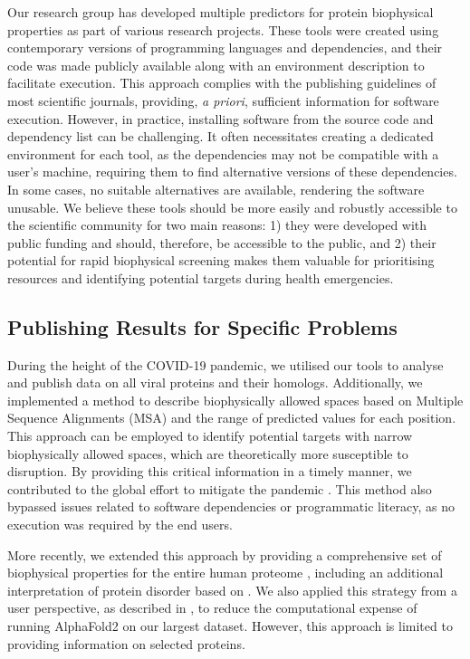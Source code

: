 Our research group has developed multiple predictors for protein biophysical properties as part of various research projects. These tools were created using contemporary versions of programming languages and dependencies, and their code was made publicly available along with an environment description to facilitate execution. This approach complies with the publishing guidelines of most scientific journals, providing, \textit{a priori}, sufficient information for software execution. However, in practice, installing software from the source code and dependency list can be challenging. It often necessitates creating a dedicated environment for each tool, as the dependencies may not be compatible with a user’s machine, requiring them to find alternative versions of these dependencies. In some cases, no suitable alternatives are available, rendering the software unusable. We believe these tools should be more easily and robustly accessible to the scientific community for two main reasons: 1) they were developed with public funding and should, therefore, be accessible to the public, and 2) their potential for rapid biophysical screening makes them valuable for prioritising resources and identifying potential targets during health emergencies.

\subsection{Publishing Results for Specific Problems}

During the height of the COVID-19 pandemic, we utilised our tools to analyse and publish data on all viral proteins and their homologs. Additionally, we implemented a method to describe biophysically allowed spaces based on Multiple Sequence Alignments (MSA) and the range of predicted values for each position. This approach can be employed to identify potential targets with narrow biophysically allowed spaces, which are theoretically more susceptible to disruption. By providing this critical information in a timely manner, we contributed to the global effort to mitigate the pandemic \cite{kagami_online_2021}. This method also bypassed issues related to software dependencies or programmatic literacy, as no execution was required by the end users.

More recently, we extended this approach by providing a comprehensive set of biophysical properties for the entire human proteome \cite{bio2byte_bio2bytes_nodate}, including an additional interpretation of protein disorder based on \cite{roca-martinez_challenges_2022}. We also applied this strategy from a user perspective, as described in \cite{gavalda-garcia_gradations_2024}, to reduce the computational expense of running AlphaFold2 on our largest dataset. However, this approach is limited to providing information on selected proteins.


